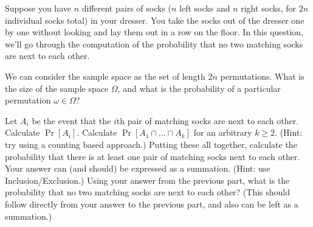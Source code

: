 \documentclass[11pt]{article}
\begin{document}
Suppose you have $n$ different pairs of socks ($n$ left socks and $n$ right socks, for $2n$ individual socks total) in your dresser. 
You take the socks out of the dresser one by one without looking and lay them out in a row on the floor. 
In this question, we'll go through the computation of the probability that no two matching socks are next to each other.

\begin{Parts}
    \Part We can consider the sample space as the set of length $2n$ permutations. What is the size of the sample space $\Omega$, and what is the probability of a particular permutation $\omega \in \Omega$?

    \Part Let $A_i$ be the event that the $i$th pair of matching socks are next to each other. Calculate $\Pr[A_i]$.
    \Part Calculate $\Pr[A_1 \cap  ... \cap A_k]$ for an arbitrary $k \geq 2$. (Hint: try using a counting based approach.)
    \Part Putting these all together, calculate the probability that there is at least one pair of matching socks next to each other. Your answer can (and should) be expressed as a summation. (Hint: use Inclusion/Exclusion.)
    \Part Using your answer from the previous part, what is the probability that no two matching socks are next to each other? (This should follow directly from your answer to the previous part, and also can be left as a summation.)
\end{Parts}
\end{document}
